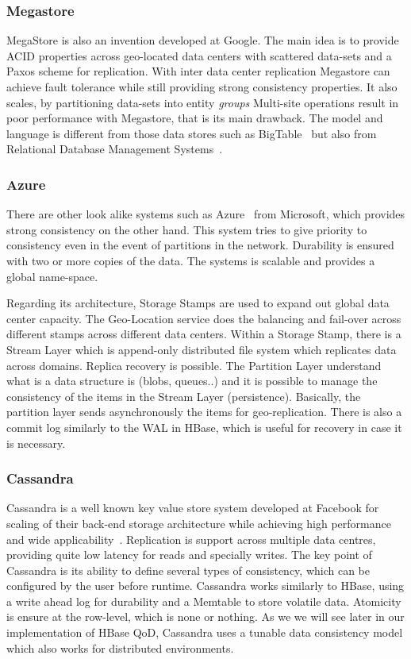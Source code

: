 \subsubsection{Megastore}
MegaStore is also an invention developed at Google. The main idea is to provide ACID properties across geo-located data centers with scattered data-sets and a Paxos scheme for replication. With inter data center replication Megastore can achieve fault tolerance while still providing strong consistency properties. It also scales, by partitioning data-sets into entity \emph{groups} Multi-site operations result in poor performance with Megastore, that is its main drawback. The model and language is different from those data stores such as BigTable~\cite{Chang:2006} but also from Relational Database Management Systems~\cite{RDBMS}.

\subsubsection{Azure}
There are other look alike systems such as Azure~\cite{Calder:2011} from Microsoft, which provides strong consistency on the other hand. This system tries to give priority to consistency even in the event of partitions in the network. Durability is ensured with two or more copies of the data. The systems is scalable and provides a global name-space.

Regarding its architecture, Storage Stamps are used to expand out global data center capacity. The Geo-Location service does the balancing and fail-over across different stamps across different data centers. Within a Storage Stamp, there is a Stream Layer which is append-only distributed file system which replicates data across domains. Replica recovery is possible. The Partition Layer understand what is a data structure is (blobs, queues..) and it is possible to manage the consistency of the items in the Stream Layer (persistence). Basically, the partition layer sends asynchronously the items for geo-replication. There is also a commit log similarly to the WAL in HBase, which is useful for recovery in case it is necessary.

\subsubsection{Cassandra}
Cassandra is a well known key value store system developed at Facebook for scaling of their back-end storage architecture while achieving high performance and wide applicability~\cite{Lakshman:2010}. Replication is support across multiple data centres, providing quite low latency for reads and specially writes. The key point of Cassandra is its ability to define several types of consistency, which can be configured by the user before runtime. Cassandra works similarly to HBase, using a write ahead log for durability and a Memtable to store volatile data. Atomicity is ensure at the row-level, which is none or nothing. As we we will see later in our implementation of HBase QoD, Cassandra uses a tunable data consistency model which also works for distributed environments. 

